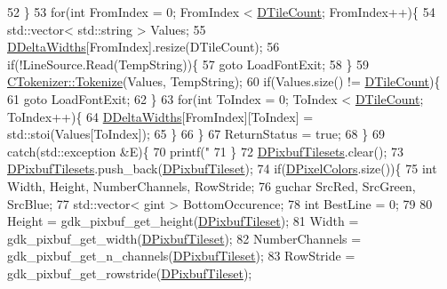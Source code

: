 \begin{DoxyCode}
52         \}
53         \textcolor{keywordflow}{for}(\textcolor{keywordtype}{int} FromIndex = 0; FromIndex < \hyperlink{classCGraphicTileset_a39d942b370e47f441bf97385eb1037c8}{DTileCount}; FromIndex++)\{
54             std::vector< std::string > Values;
55             \hyperlink{classCFontTileset_a1e253853e14282e9582a7f47dace8f70}{DDeltaWidths}[FromIndex].resize(DTileCount);
56             \textcolor{keywordflow}{if}(!LineSource.Read(TempString))\{
57                 \textcolor{keywordflow}{goto} LoadFontExit;
58             \}
59             \hyperlink{classCTokenizer_a7477f6849a3d0a5154879d8622e4012c}{CTokenizer::Tokenize}(Values, TempString);
60             \textcolor{keywordflow}{if}(Values.size() != \hyperlink{classCGraphicTileset_a39d942b370e47f441bf97385eb1037c8}{DTileCount})\{
61                 \textcolor{keywordflow}{goto} LoadFontExit;
62             \}
63             \textcolor{keywordflow}{for}(\textcolor{keywordtype}{int} ToIndex = 0; ToIndex < \hyperlink{classCGraphicTileset_a39d942b370e47f441bf97385eb1037c8}{DTileCount}; ToIndex++)\{
64                 \hyperlink{classCFontTileset_a1e253853e14282e9582a7f47dace8f70}{DDeltaWidths}[FromIndex][ToIndex] = std::stoi(Values[ToIndex]);
65             \}
66         \}
67         ReturnStatus = \textcolor{keyword}{true};
68     \}
69     \textcolor{keywordflow}{catch}(std::exception &E)\{
70         printf(\textcolor{stringliteral}{"%
71     \}
72     \hyperlink{classCFontTileset_ae6e92dd613809fb15892b51e0e6b4940}{DPixbufTilesets}.clear();
73     \hyperlink{classCFontTileset_ae6e92dd613809fb15892b51e0e6b4940}{DPixbufTilesets}.push\_back(\hyperlink{classCGraphicTileset_a5d5adfcdbb347a6df3f57535ca08e3ef}{DPixbufTileset});
74     \textcolor{keywordflow}{if}(\hyperlink{classCGraphicTileset_a4e9672b8b133dbac600fb8bb400d1cb3}{DPixelColors}.size())\{
75         \textcolor{keywordtype}{int} Width, Height, NumberChannels, RowStride;
76         guchar SrcRed, SrcGreen, SrcBlue;
77         std::vector< gint > BottomOccurence;
78         \textcolor{keywordtype}{int} BestLine = 0;
79         
80         Height = gdk\_pixbuf\_get\_height(\hyperlink{classCGraphicTileset_a5d5adfcdbb347a6df3f57535ca08e3ef}{DPixbufTileset});
81         Width = gdk\_pixbuf\_get\_width(\hyperlink{classCGraphicTileset_a5d5adfcdbb347a6df3f57535ca08e3ef}{DPixbufTileset});
82         NumberChannels = gdk\_pixbuf\_get\_n\_channels(\hyperlink{classCGraphicTileset_a5d5adfcdbb347a6df3f57535ca08e3ef}{DPixbufTileset});
83         RowStride = gdk\_pixbuf\_get\_rowstride(\hyperlink{classCGraphicTileset_a5d5adfcdbb347a6df3f57535ca08e3ef}{DPixbufTileset});
}
\end{DoxyCode}
